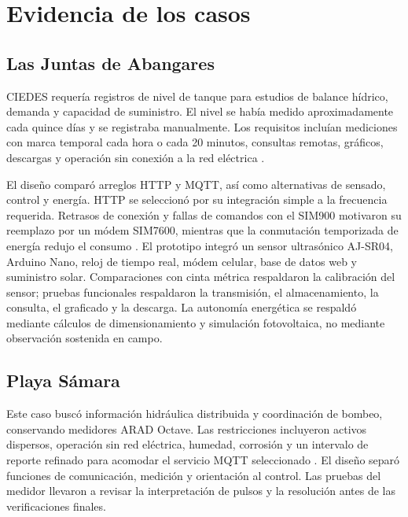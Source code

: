 \documentclass[conference]{IEEEtran}
\begin{document}
\section{Evidencia de los casos}

\subsection{Las Juntas de Abangares}

CIEDES requería registros de nivel de tanque para estudios de balance hídrico, demanda y capacidad de suministro. El nivel se había medido aproximadamente cada quince días y se registraba manualmente. Los requisitos incluían mediciones con marca temporal cada hora o cada 20 minutos, consultas remotas, gráficos, descargas y operación sin conexión a la red eléctrica \cite[Secs.~4.1--4.3]{chavarria2021implementacion}.

El diseño comparó arreglos HTTP y MQTT, así como alternativas de sensado, control y energía. HTTP se seleccionó por su integración simple a la frecuencia requerida. Retrasos de conexión y fallas de comandos con el SIM900 motivaron su reemplazo por un módem SIM7600, mientras que la conmutación temporizada de energía redujo el consumo \cite[Secs.~4.4--5.1]{chavarria2021implementacion}. El prototipo integró un sensor ultrasónico AJ-SR04, Arduino Nano, reloj de tiempo real, módem celular, base de datos web y suministro solar. Comparaciones con cinta métrica respaldaron la calibración del sensor; pruebas funcionales respaldaron la transmisión, el almacenamiento, la consulta, el graficado y la descarga. La autonomía energética se respaldó mediante cálculos de dimensionamiento y simulación fotovoltaica, no mediante observación sostenida en campo.

\subsection{Playa Sámara}

Este caso buscó información hidráulica distribuida y coordinación de bombeo, conservando medidores ARAD Octave. Las restricciones incluyeron activos dispersos, operación sin red eléctrica, humedad, corrosión y un intervalo de reporte refinado para acomodar el servicio MQTT seleccionado \cite[Secs.~1.3--2.1]{solorzano2021sistema}. El diseño separó funciones de comunicación, medición y orientación al control. Las pruebas del medidor llevaron a revisar la interpretación de pulsos y la resolución antes de las verificaciones finales.
\end{document}
